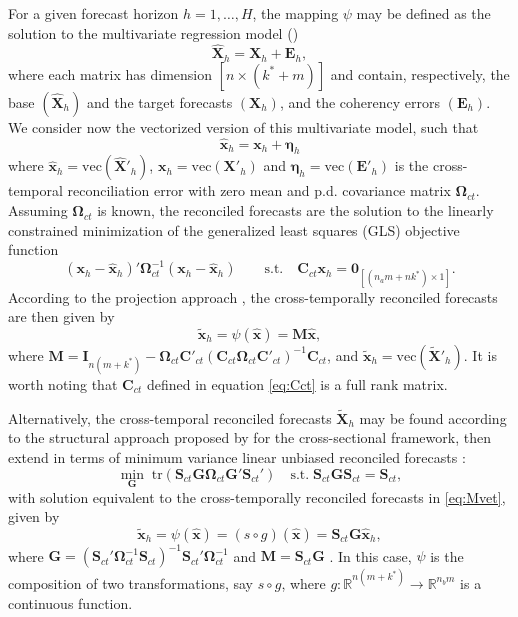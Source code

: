\documentclass[a4paper,11pt]{article}
\newcommand{\etavet}{\bm{\eta}}
\newcommand{\xvet}{\bm{x}}
\newcommand{\Cvet}{\bm{C}}
\newcommand{\Evet}{\bm{E}}
\newcommand{\Gvet}{\bm{G}}
\newcommand{\Ivet}{\bm{I}}
\newcommand{\Mvet}{\bm{M}}
\newcommand{\Svet}{\bm{S}}
\newcommand{\Xvet}{\bm{X}}
\newcommand{\Zerovet}{\bm{0}}
\newcommand{\Omegavet}{\bm{\Omega}}
\theoremstyle{definition}
\begin{document}
For a given forecast horizon $h = 1,\dots, H$, the mapping $\psi$ may be defined as the solution to the multivariate regression model (\citealp{difonzo2023})
$$
	\widehat{\Xvet}_{h} = \Xvet_{h} + \Evet_{h},
$$
where each matrix has dimension $[n \times (k^\ast + m)]$ and contain, respectively, the base $(\widehat{\Xvet}_{h})$ and the target forecasts $(\Xvet_{h})$, and the coherency errors $(\Evet_{h})$. We consider now the vectorized version of this multivariate model, such that
$$
	\widehat{\xvet}_{h} = \xvet_{h} + \etavet_{h}
$$
where $\widehat{\xvet}_{h} = \mathrm{vec}(\widehat{\Xvet}'_{h})$, $\xvet_{h} = \mathrm{vec}(\Xvet'_{h})$ and $\etavet_{h} = \mathrm{vec}(\Evet'_{h})$  is the cross-temporal reconciliation error with zero mean and p.d. covariance matrix $\Omegavet_{ct}$.
Assuming $\Omegavet_{ct}$ is known, the reconciled forecasts are the solution to the linearly constrained minimization of the generalized least squares (GLS) objective function
$$
	\left(\xvet_h - \widehat{\xvet}_h\right)' \Omegavet_{ct}^{-1}\left(\xvet_h - \widehat{\xvet}_h\right)  \qquad \text{s.t.} \quad \Cvet_{ct}\xvet_h = \Zerovet_{[(n_am+nk^\ast)\times1]}.
$$
According to the projection approach \citep{byron1978,byron1979, vanerven2015, wickramasuriya2019, panagiotelis2021, difonzo2023}, the cross-temporally reconciled forecasts are then given by
\begin{equation}
	\label{eq:Mvet}
	\widetilde{\xvet}_{h} = \psi\left(\widehat{\xvet}\right) = \Mvet \widehat{\xvet},
\end{equation}
where $\Mvet = \Ivet_{n(m+ k^\ast)} - \Omegavet_{ct}\Cvet'_{ct}\left(\Cvet_{ct}\Omegavet_{ct}\Cvet'_{ct}\right)^{-1}\Cvet_{ct}$, and $\widetilde{\xvet}_{h} = \mathrm{vec}(\widetilde{\Xvet}'_{h})$. It is worth noting that $\Cvet_{ct}$ defined in equation \eqref{eq:Cct} is a full rank matrix.

Alternatively, the cross-temporal reconciled forecasts $\widetilde{\Xvet}_{h}$ may be found according to the structural approach proposed by \cite{hyndman2011} for the cross-sectional framework, then extend in terms of minimum variance linear unbiased reconciled forecasts \citep{wickramasuriya2019}:
$$
	\min_{\Gvet} \; \text{tr}\left(\Svet_{ct}\Gvet\Omegavet_{ct}\Gvet'\Svet_{ct}' \right) \quad \text{s.t.} \; \Svet_{ct}\Gvet\Svet_{ct} = \Svet_{ct},
$$
with solution equivalent to the cross-temporally reconciled forecasts in \eqref{eq:Mvet}, given by
\begin{equation}\label{eq:SGy}
	\widetilde{\xvet}_{h} = \psi\left(\widehat{\xvet}\right) = \left(s \circ g \right)\left(\widehat{\xvet}\right)=\Svet_{ct}\Gvet \widehat{\xvet}_{h},
\end{equation}
where $\Gvet = (\Svet_{ct}' \Omegavet_{ct}^{-1}\Svet_{ct})^{-1} \Svet_{ct}'\Omegavet_{ct}^{-1}$ and $\Mvet = \Svet_{ct} \Gvet$ \citep{wickramasuriya2019, difonzo2023}. In this case, $\psi$ is the composition of two transformations, say $s \circ g$, where $g: \mathbb{R}^{n(m+k^\ast)} \rightarrow \mathbb{R}^{n_b m}$ is a continuous function.
\end{document}
